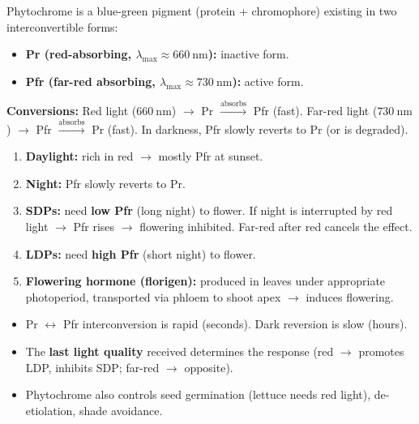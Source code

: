 \documentclass[11pt]{article}
\newcommand{\cle}[1]{{\popxbold\color{popdark}#1}}
\begin{document}
\begin{propriete}
\cle{Phytochrome} is a blue-green pigment (protein + chromophore) existing in two interconvertible forms:
\begin{itemize}
\item \textbf{Pr (red-absorbing, $\lambda_{\max} \approx 660\ \mathrm{nm}$):} inactive form.
\item \textbf{Pfr (far-red absorbing, $\lambda_{\max} \approx 730\ \mathrm{nm}$):} active form.
\end{itemize}
\textbf{Conversions:} Red light ($660\ \mathrm{nm}$) $\rightarrow$ Pr $\xrightarrow{\text{absorbs}}$ Pfr (fast). Far-red light ($730\ \mathrm{nm}$) $\rightarrow$ Pfr $\xrightarrow{\text{absorbs}}$ Pr (fast). In darkness, Pfr slowly reverts to Pr (or is degraded).
\end{propriete}

\begin{methode}
\begin{enumerate}
\item \textbf{Daylight:} rich in red $\rightarrow$ mostly Pfr at sunset.
\item \textbf{Night:} Pfr slowly reverts to Pr.
\item \textbf{SDPs:} need \textbf{low Pfr} (long night) to flower. If night is interrupted by red light $\rightarrow$ Pfr rises $\rightarrow$ flowering inhibited. Far-red after red cancels the effect.
\item \textbf{LDPs:} need \textbf{high Pfr} (short night) to flower.
\item \textbf{Flowering hormone (florigen):} produced in leaves under appropriate photoperiod, transported via phloem to shoot apex $\rightarrow$ induces flowering.
\end{enumerate}
\end{methode}

\begin{attention}
\begin{itemize}
\item Pr $\leftrightarrow$ Pfr interconversion is rapid (seconds). Dark reversion is slow (hours).
\item The \textbf{last light quality} received determines the response (red $\rightarrow$ promotes LDP, inhibits SDP; far-red $\rightarrow$ opposite).
\item Phytochrome also controls seed germination (lettuce needs red light), de-etiolation, shade avoidance.
\end{itemize}
\end{attention}
\end{document}
